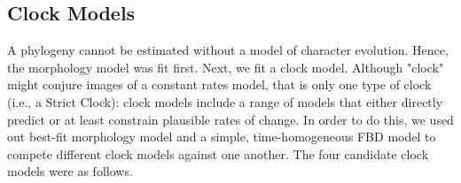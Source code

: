 \documentclass{article}
\begin{document}
\subsection{Clock Models}

A phylogeny cannot be estimated without a model of character evolution. %
Hence, the morphology model was fit first.
Next, we fit a clock model.
Although "clock" might conjure images of a constant rates model, that is only one type of clock (i.e., a Strict Clock): clock models include a range of models that either directly predict or at least constrain plausible rates of change. %
In order to do this, we used out best-fit morphology model and a simple, time-homogeneous FBD model to compete different clock models against one another.
The four candidate clock models were as follows.
\end{document}
